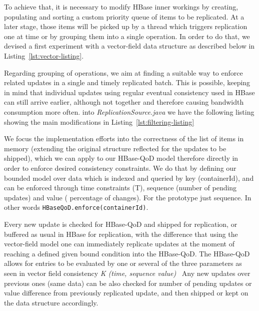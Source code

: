 To achieve that, it is necessary to modify HBase inner workings by creating, populating and sorting a custom priority queue of items to be replicated. At a later stage, those items will be picked up by a thread which triggers replication one at time or by grouping them into a single operation. In order to do that, we devised a first experiment with a vector-field data structure as described below in Listing~\ref{lst:vector-listing}.


Regarding grouping of operations, we aim at finding a suitable way to enforce related updates in a single and timely replicated batch. This is possible, keeping in mind that individual updates using regular eventual consistency used in HBase can still arrive earlier, although not together and therefore causing bandwidth consumption more often.  into \emph{ReplicationSource.java} we have the following listing showing the main modifications in Listing~\ref{lst:filtering-listing}





We focus the implementation efforts into the correctness of the list of items in memory (extending the original structure reflected for the updates to be shipped), which we can apply to our HBase-QoD model therefore directly in order to enforce desired consistency constraints. We do that by defining our bounded model over data which is indexed and queried by key (containerId), and can be enforced through time constraints (T), sequence (number of pending updates) and value ( percentage of changes). For the prototype just sequence. In other words \texttt{HBaseQoD.enforce(containerId)}.

Every new update is checked for HBase-QoD and shipped for replication, or buffered as usual in HBase for replication, with the difference that using the vector-field model one can immediately replicate updates at the moment of reaching a defined given bound condition into the HBase-QoD. The HBase-QoD allows for entries to be evaluated by one or several of the three parameters as seen in vector field consistency \emph{K (time, sequence value)}~\cite{Santos:2007} Any new updates over previous ones (same data) can be also checked for number of pending updates or value difference from previously replicated update, and then shipped or kept on the data structure accordingly.



